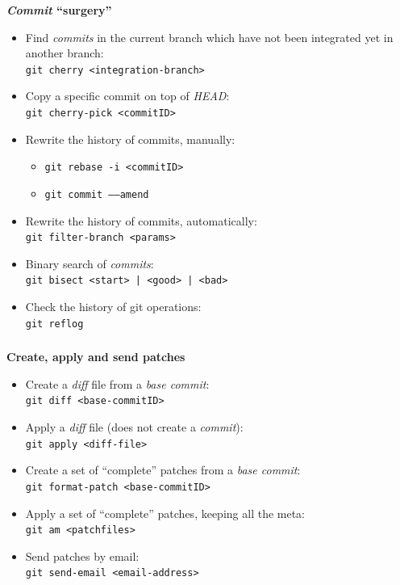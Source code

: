 \begin{frame}[fragile]
  \frametitle{\insertsubsection}

  \textbf{\textit{Commit} ``surgery''} \\
  \begin{itemize}
  \item Find \textit{commits} in the current branch which have not
    been integrated yet in another branch:\\
    \texttt{git cherry <integration-branch>}
    \vspacing
  \item Copy a specific commit on top of \textit{HEAD}:\\
    \texttt{git cherry-pick <commitID>}
    \vspacing
  \item Rewrite the history of commits, manually:
    \begin{itemize}
      \item \texttt{git rebase -i <commitID>}
      \item \texttt{git commit \---\---amend}
    \end{itemize}
  \item Rewrite the history of commits, automatically:\\
    \texttt{git filter-branch <params>}
    \vspacing
  \item Binary search of \textit{commits}:\\
    \texttt{git bisect <start> | <good> | <bad>}
    \vspacing
  \item Check the history of git operations:\\
    \texttt{git reflog} \vspacing
  \end{itemize}
\end{frame}

\begin{frame}
  \frametitle{\insertsubsection}

  \textbf{Create, apply and send patches} \\
  \begin{itemize}
  \item Create a \textit{diff} file from a \textit{base commit}:\\
    \texttt{git diff <base-commitID>}
    \vspacing
  \item Apply a \textit{diff} file (does not create a \textit{commit}):\\
    \texttt{git apply <diff-file>}
    \vspacing
  \item Create a set of ``complete'' patches from a \textit{base commit}:\\
    \texttt{git format-patch <base-commitID>}
    \vspacing
  \item Apply a set of ``complete'' patches, keeping all the meta:\\
    \texttt{git am <patchfiles>}
    \vspacing
  \item Send patches by email:\\
    \texttt{git send-email <email-address>}
    \vspacing
  \end{itemize}
\end{frame}

